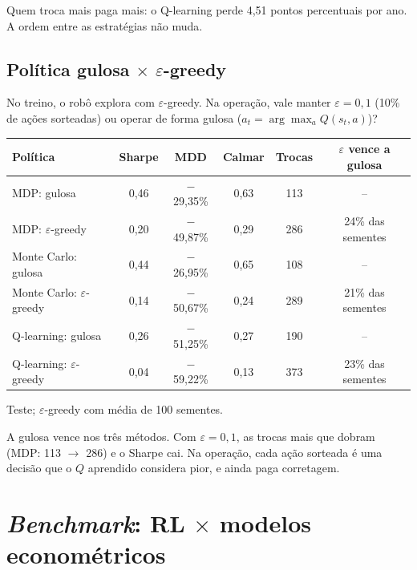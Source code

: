 \documentclass[11pt,a4paper]{article}
\begin{document}
Quem troca mais paga mais: o Q-learning perde 4,51 pontos percentuais por ano. A ordem entre as estratégias não muda.

\subsection{Política gulosa \texorpdfstring{$\times$ $\varepsilon$}{x epsilon}-greedy}

No treino, o robô explora com $\varepsilon$-greedy. Na operação, vale manter $\varepsilon = 0{,}1$ (10\% de ações sorteadas) ou operar de forma gulosa ($a_t = \arg\max_a Q(s_t,a)$)?

\begin{center}
\small
\begin{tabular}{l ccccc}
  \toprule
  \textbf{Política} & \textbf{Sharpe} & \textbf{MDD} & \textbf{Calmar} & \textbf{Trocas} & \textbf{$\varepsilon$ vence a gulosa} \\
  \midrule
  MDP: gulosa                       & 0,46 & $-$29,35\% & 0,63 & 113 & -- \\
  MDP: $\varepsilon$-greedy         & 0,20 & $-$49,87\% & 0,29 & 286 & 24\% das sementes \\
  \midrule
  Monte Carlo: gulosa               & 0,44 & $-$26,95\% & 0,65 & 108 & -- \\
  Monte Carlo: $\varepsilon$-greedy & 0,14 & $-$50,67\% & 0,24 & 289 & 21\% das sementes \\
  \midrule
  Q-learning: gulosa                & 0,26 & $-$51,25\% & 0,27 & 190 & -- \\
  Q-learning: $\varepsilon$-greedy  & 0,04 & $-$59,22\% & 0,13 & 373 & 23\% das sementes \\
  \bottomrule
\end{tabular}

\smallskip
{\footnotesize Teste; $\varepsilon$-greedy com média de 100 sementes.}
\end{center}

A gulosa vence nos três métodos. Com $\varepsilon = 0{,}1$, as trocas mais que dobram (MDP: 113 $\to$ 286) e o Sharpe cai. Na operação, cada ação sorteada é uma decisão que o $Q$ aprendido considera pior, e ainda paga corretagem.

\section{\textit{Benchmark}: RL \texorpdfstring{$\times$}{x} modelos econométricos}
\end{document}
